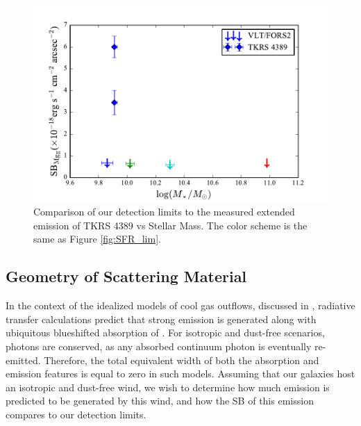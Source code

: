 \documentclass[twocolumn]{aastex61}
\begin{document}
\begin{figure}[!htb]
\centering
\includegraphics[scale=0.6]{../Figures/mass_limits.pdf}
\caption{Comparison of our detection limits to the measured extended emission of TKRS 4389 vs Stellar Mass. The color scheme is the same as Figure \ref{fig:SFR_lim}.}
\label{fig:detection_lim}
\end{figure}

\subsection{Geometry of Scattering Material}
In the context of the idealized models of cool gas outflows, discussed in \cite{Prochaska_2011}, radiative transfer calculations predict that strong  emission is generated along with ubiquitous blueshifted absorption of . For isotropic and dust-free scenarios, photons are conserved, as any absorbed continuum photon is eventually re-emitted.  Therefore, the total equivalent width of both the absorption and emission features is equal to zero in such models. Assuming that our galaxies host an isotropic and dust-free wind, we wish to determine how much emission is predicted to be generated by this wind, and how the SB of this emission compares to our detection limits.
\end{document}
